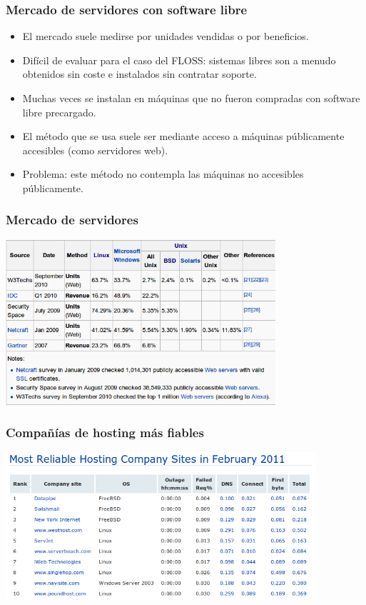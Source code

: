 \documentclass{beamer}
\begin{document}

\begin{frame}
\frametitle{Mercado de servidores con software libre}

\begin{itemize}
\item El mercado suele medirse por unidades vendidas o por beneficios.
\item Difícil de evaluar para el caso del FLOSS: sistemas libres son a menudo obtenidos sin coste e instalados sin contratar soporte.
\item Muchas veces se instalan en máquinas que no fueron compradas con software libre precargado.
\item El método que se usa suele ser mediante acceso a máquinas públicamente accesibles (como servidores web).
\item Problema: este método no contempla las máquinas no accesibles públicamente.
\end{itemize}
\end{frame}



\begin{frame}
\frametitle{Mercado de servidores}

\begin{center}
\includegraphics[width=10.0cm]{figs/servers-market.png}
\end{center}

\end{frame}


\begin{frame}
\frametitle{Compañías de hosting más fiables}

\begin{center}
\includegraphics[width=11.5cm]{figs/netcraft.png}
\end{center}

\end{frame}
\end{document}
